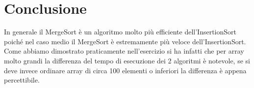 \documentclass[12pt]{article}
\begin{document}
\section{Conclusione}
In generale il MergeSort è un algoritmo molto più efficiente dell'InsertionSort poiché nel caso medio il MergeSort è estremamente più veloce dell'InsertionSort. Come abbiamo dimostrato praticamente nell'esercizio si ha infatti che per array molto grandi la differenza del tempo di esecuzione dei 2 algoritmi è notevole, se si deve invece ordinare array di circa 100 elementi o inferiori la differenza è appena percettibile. 
\end{document}
